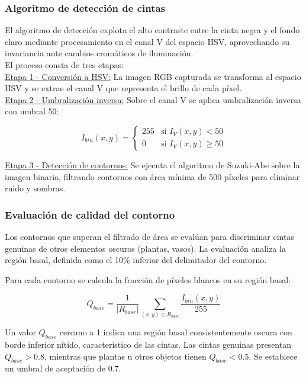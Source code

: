 \subsubsection{Algoritmo de detección de cintas}

El algoritmo de detección explota el alto contraste entre la cinta negra y el fondo claro mediante procesamiento en el canal V del espacio HSV, aprovechando su invariancia ante cambios cromáticos de iluminación.\\

El proceso consta de tres etapas:\\

\underline{Etapa 1 - Conversión a HSV:} La imagen RGB capturada se transforma al espacio HSV y se extrae el canal V que representa el brillo de cada píxel.\\

\underline{Etapa 2 - Umbralización inversa:} Sobre el canal V se aplica umbralización inversa con umbral 50:

\begin{equation}
I_{bin}(x,y) = \begin{cases}
255 & \text{si } I_V(x,y) < 50 \\
0 & \text{si } I_V(x,y) \geq 50
\end{cases}
\end{equation}

\underline{Etapa 3 - Detección de contornos:} Se ejecuta el algoritmo de Suzuki-Abe sobre la imagen binaria, filtrando contornos con área mínima de 500 píxeles para eliminar ruido y sombras.

\subsubsection{Evaluación de calidad del contorno}

Los contornos que superan el filtrado de área se evalúan para discriminar cintas genuinas de otros elementos oscuros (plantas, vasos). La evaluación analiza la región basal, definida como el 10\% inferior del delimitador del contorno.

Para cada contorno se calcula la fracción de píxeles blancos en su región basal:

\begin{equation}
Q_{base} = \frac{1}{|R_{base}|} \sum_{(x,y) \in R_{base}} \frac{I_{bin}(x,y)}{255}
\end{equation}

Un valor $Q_{base}$ cercano a 1 indica una región basal consistentemente oscura con borde inferior nítido, característico de las cintas. Las cintas genuinas presentan $Q_{base} > 0.8$, mientras que plantas u otros objetos tienen $Q_{base} < 0.5$. Se establece un umbral de aceptación de 0.7.

